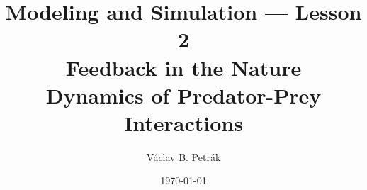 \documentclass[11pt]{beamer}
\title{
Modeling and Simulation --- Lesson 2\\
\textbf{Feedback in the Nature\\
Dynamics of Predator-Prey Interactions}}
\author{Václav B. Petrák}
\institute{Faculty of Biomedical Engineering\\
Czech Technical University}
\date{\today}
\begin{document}
\begin{frame}
  \titlepage
\end{frame}

%     
    
\end{document}
